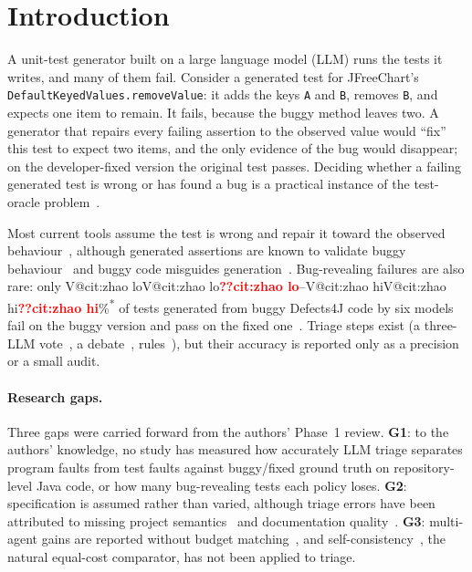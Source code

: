 \documentclass[journal]{IEEEtran}
\makeatletter
\newcommand{\V}[1]{\ifcsname V@#1\endcsname\csname V@#1\endcsname\else\textbf{\textcolor{red}{??#1}}\fi}
\newcommand{\cited}{\textsuperscript{*}}
\makeatother
\begin{document}
\section{Introduction}\label{sec:intro}

A unit-test generator built on a large language model (LLM) runs the tests it writes, and many of them fail. Consider a generated test for JFreeChart's \texttt{DefaultKeyedValues.removeValue}: it adds the keys \texttt{A} and \texttt{B}, removes \texttt{B}, and expects one item to remain. It fails, because the buggy method leaves two. A generator that repairs every failing assertion to the observed value would ``fix'' this test to expect two items, and the only evidence of the bug would disappear; on the developer-fixed version the original test passes. Deciding whether a failing generated test is wrong or has found a bug is a practical instance of the test-oracle problem~\cite{barr2015oracle}.

Most current tools assume the test is wrong and repair it toward the observed behaviour~\cite{gu2026testart,hayet2025chatassert,yaraghi2025target}, although generated assertions are known to validate buggy behaviour~\cite{mathews2026validate} and buggy code misguides generation~\cite{zhao2026misguidance,li2026selfrepair}. Bug-revealing failures are also rare: only \V{cit:zhao lo}--\V{cit:zhao hi}\%\cited{} of tests generated from buggy Defects4J code by six models fail on the buggy version and pass on the fixed one~\cite{zhao2026misguidance}. Triage steps exist (a three-LLM vote~\cite{liu2026jstestcraft}, a debate~\cite{fu2026javaoracle}, rules~\cite{maddila2026agentic}), but their accuracy is reported only as a precision or a small audit.

\paragraph{Research gaps.} Three gaps were carried forward from the authors' Phase~1 review. \textbf{G1}: to the authors' knowledge, no study has measured how accurately LLM triage separates program faults from test faults against buggy/fixed ground truth on repository-level Java code, or how many bug-revealing tests each policy loses. \textbf{G2}: specification is assumed rather than varied, although triage errors have been attributed to missing project semantics~\cite{liu2026jstestcraft} and documentation quality~\cite{fu2026javaoracle}. \textbf{G3}: multi-agent gains are reported without budget matching~\cite{xie2026maco,xu2026candor,liu2026jstestcraft}, and self-consistency~\cite{wang2023selfconsistency}, the natural equal-cost comparator, has not been applied to triage.
\end{document}
